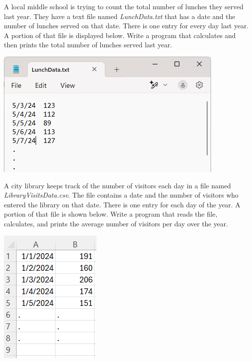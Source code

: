 




	\item 
		A local middle school is trying to count the total number of lunches they served last year.  
		They have a text file named \textit{LunchData.txt} that has a date and the number of lunches served on that date.    
		There is one entry for every day last year.  A portion of that file is displayed below.  
		Write a program that calculates and then prints the total number of lunches served last year. 
		\begin{flushright}
			\includegraphics[scale=.65]{imgs/LunchData.PNG}
		\end{flushright}




	\item 
		A city library keeps track of the number of visitors each day in a file named 
		\textit{LibraryVisitsData.csv}.  
		The file contains a date and the number of visitors who entered the library on that date.  
		There is one entry for each day of the year. A portion of that file is shown below.  
		Write a program that reads the file, calculates, and prints the average number of visitors 
		per day over the year.
		
		\begin{flushright}
			\includegraphics[scale=.65]{imgs/LibraryVisitsData.PNG}
		\end{flushright}



